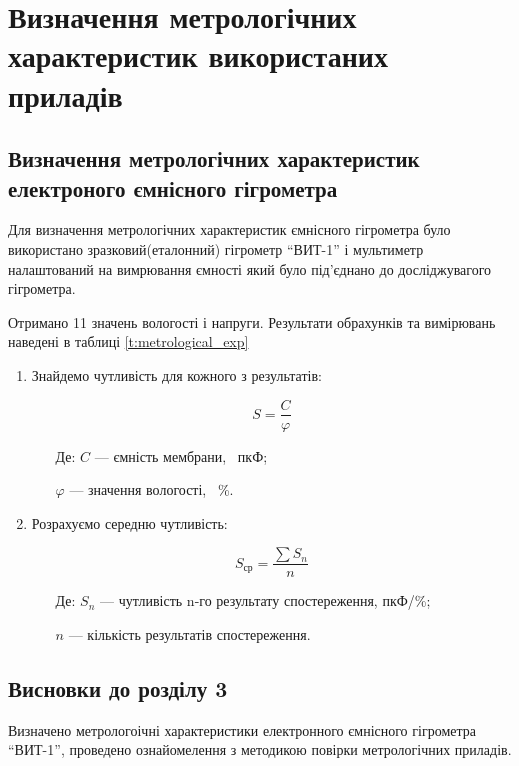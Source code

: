 \chapter{Визначення метрологічних характеристик використаних приладів}
\section{Визначення метрологічних характеристик електроного ємнісного гігрометра}

Для визначення метрологічних характеристик ємнісного гігрометра було використано
зразковий(еталонний) гігрометр ``ВИТ-1'' і мультиметр налаштований на вимрювання ємності який було
під’єднано до досліджувагого гігрометра.

Отримано 11 значень вологості і напруги. Результати обрахунків та вимірювань наведені в таблиці \ref{t:metrological_exp}



\begin{enumerate}[leftmargin=*]
    \item Знайдемо чутливість для кожного з результатів:

    \begin{equation}
        S = \frac{C}{\varphi}
    \end{equation}

    \begin{itemize}
        \item [Де:] $C$ --- ємність мембрани, ~пкФ;
        \item []$\varphi$ ---  значення вологості, ~\%.
    \end{itemize}

    

    \item Розрахуємо середню чутливість:

    \begin{equation}
    S_{\text{ср}} = \frac{\sum S_n}{n}
    \end{equation}

    \begin{itemize}
        \item [Де:] $S_n$ --- чутливість n-го результату спостереження, пкФ/\%;
        \item []$n$ ---  кількість результатів спостереження.
    \end{itemize}

    
\end{enumerate}

\section*{Висновки до розділу 3}

Визначено метрологоічні характеристики електронного ємнісного гігрометра ``ВИТ-1'', проведено
ознайомелення з методикою повірки метрологічних приладів.
